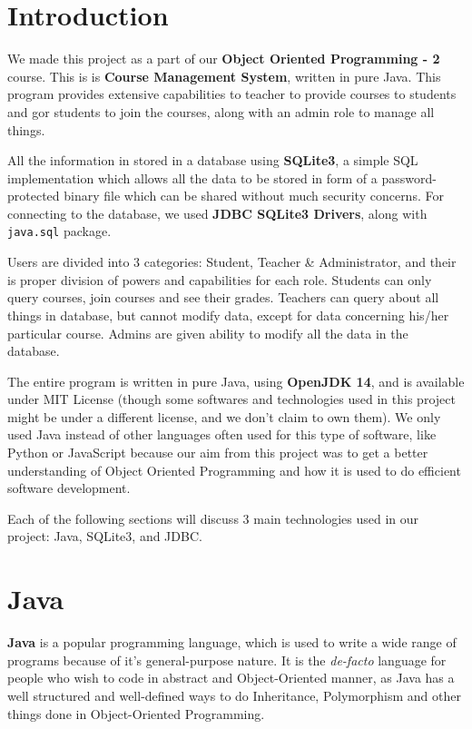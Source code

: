 \documentclass[12pt, a4paper]{article}
\begin{document}
\section*{Introduction}

We made this project as a part of our \textbf{Object Oriented Programming - 2} course. This is is \textbf{Course Management System}, written in pure Java. This program provides extensive capabilities to teacher to provide courses to students and gor students to join the courses, along with an admin role to manage all things.

All the information in stored in a database using \textbf{SQLite3}, a simple SQL implementation which allows all the data to be stored in form of a password-protected binary file which can be shared without much security concerns. For connecting to the database, we used \textbf{JDBC SQLite3 Drivers}, along with \lstinline{java.sql} package.

Users are divided into 3 categories: Student, Teacher \& Administrator, and their is proper division of powers and capabilities for each role. Students can only query courses, join courses and see their grades. Teachers can query about all things in database, but cannot modify data, except for data concerning his/her particular course. Admins are given ability to modify all the data in the database.


The entire program is written in pure Java, using \textbf{OpenJDK 14}, and is available under MIT License (though some softwares and technologies used in this project might be under a different license, and we don't claim to own them). We only used Java instead of other languages often used for this type of software, like Python or JavaScript because our aim from this project was to get a better understanding of Object Oriented Programming and how it is used to do efficient software development.

Each of the following sections will discuss 3 main technologies used in our project: Java, SQLite3, and JDBC.

\newpage

\section{Java}

\textbf{Java} is a popular programming language, which is used to write a wide range of programs because of it's general-purpose nature. It is the \textit{de-facto} language for people who wish to code in abstract and Object-Oriented manner, as Java has a well structured and well-defined ways to do Inheritance, Polymorphism and other things done in Object-Oriented Programming.
\end{document}
